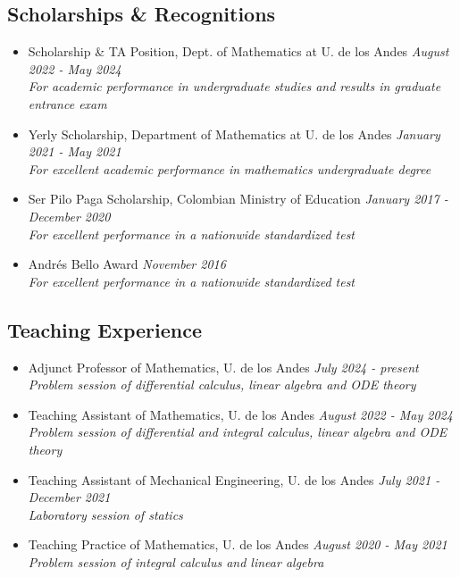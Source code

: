 \documentclass{article}
\begin{document}
\subsection*{Scholarships \& Recognitions}
\begin{itemize}
\item Scholarship \& TA Position, Dept. of Mathematics at U. de los Andes \hfill \emph{August 2022 - May 2024}\\
\textit{For academic performance in undergraduate studies and results in graduate entrance exam}
\item Yerly Scholarship, Department of Mathematics at U. de los Andes \hfill \emph{January 2021 - May 2021}\\
\textit{For excellent academic performance in mathematics undergraduate degree}
\item Ser Pilo Paga Scholarship, Colombian Ministry of Education \hfill \emph{January 2017 - December 2020}\\
\textit{For excellent performance in a nationwide standardized test}
\item Andr\'es Bello Award \hfill \emph{November 2016}\\
\textit{For excellent performance in a nationwide standardized test}
\end{itemize}
\subsection*{Teaching Experience}
\begin{itemize}
\item Adjunct Professor of Mathematics, U. de los Andes \hfill {\em July 2024 - present}\\
\textit{Problem session of differential calculus, linear algebra and ODE theory}
\item Teaching Assistant of Mathematics, U. de los Andes \hfill {\em August 2022 - May 2024}\\
\textit{Problem session of differential and integral calculus, linear algebra and ODE theory}
\item Teaching Assistant of Mechanical Engineering, U. de los Andes \hfill {\em July 2021 - December 2021}\\
\textit{Laboratory session of statics}
\item Teaching Practice of Mathematics, U. de los Andes \hfill {\em August 2020 - May 2021}\\
\textit{Problem session of integral calculus and linear algebra}
\end{itemize}
\end{document}

